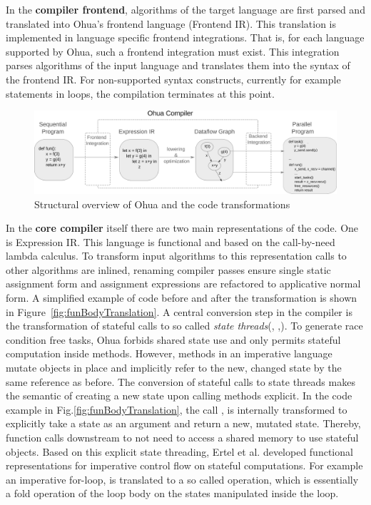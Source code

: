 In the \textbf{compiler frontend}, algorithms of the target language are first parsed and translated into Ohua's frontend language (Frontend IR). This translation is implemented in language specific frontend integrations. That is, for each language supported by Ohua, such a frontend integration must exist. This integration parses algorithms of the input language and translates them into the syntax of the frontend IR. For non-supported syntax constructs, currently for example  statements in loops, the compilation terminates at this point. 

\begin{figure}[H]
    \centering
    \includegraphics[scale= 0.36]{figures/ohua_fine_with_channels.png}
    \caption{Structural overview of Ohua and the code transformations}
    \label{fig:ohua_fine}
\end{figure}

In the \textbf{core compiler} itself there are two main representations of the code. One is Expression IR. This language is functional and based on the call-by-need lambda calculus. To transform input algorithms to this representation 
calls to other algorithms are inlined, renaming compiler passes ensure single static assignment form and assignment expressions are refactored to applicative normal form. A simplified example of code before and after the transformation is shown in Figure~\ref{fig:funBodyTranslation}. A central conversion step in the compiler is the transformation of stateful calls to so called \emph{state threads}(\cite{wadler1992essence}, \cite{launchbury1994lazy},\cite{ertel2019stclang}). To generate race condition free tasks, Ohua forbids shared state use and only permits stateful computation inside methods. However, methods in an imperative language mutate objects in place and implicitly refer to the new, changed state by the same reference as before. The conversion of stateful calls to state threads makes the semantic of creating a new state upon calling methods explicit. In the code example in Fig.\ref{fig:funBodyTranslation}, the call , is internally transformed to explicitly take a state as an argument and return a new, mutated state. Thereby, function calls downstream to not need to access a shared memory to use stateful objects. Based on this explicit state threading, Ertel et al. \cite{ertel2019stclang, ertel2018supporting} developed functional representations for imperative control flow on stateful computations. For example an imperative for-loop, is translated to a so called  operation, which is essentially a fold operation of the loop body on the states manipulated inside the loop.  


